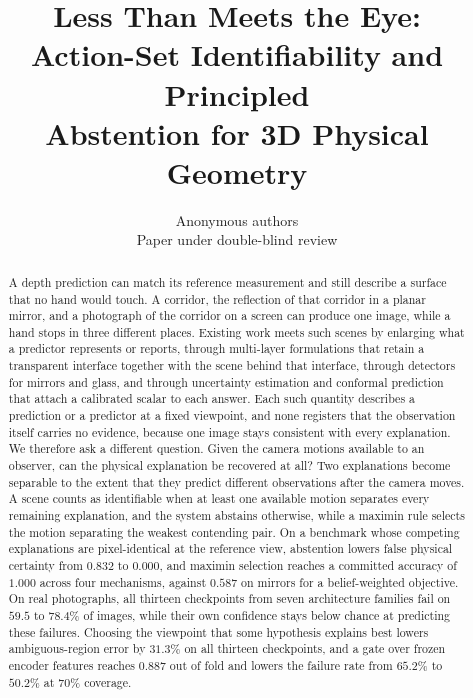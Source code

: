 \documentclass{article} %
\title{Less Than Meets the Eye: \\Action-Set Identifiability and Principled\\Abstention for 3D Physical Geometry}
\author{Anonymous authors \\ Paper under double-blind review}
\theoremstyle{defstyle}
\theoremstyle{plain}
\begin{document}
\maketitle
\suppressfloats[t]

\begin{abstract}
A depth prediction can match its reference measurement and still describe a surface that no
hand would touch. A corridor, the reflection of that corridor in a planar mirror, and a
photograph of the corridor on a screen can produce one image, while a hand stops in three
different places. Existing work meets such scenes by enlarging what a predictor
represents or reports, through multi-layer formulations that retain a transparent interface
together with the scene behind that interface, through detectors for mirrors and glass, and
through uncertainty estimation and conformal prediction that attach a calibrated scalar to
each answer. Each such quantity describes a prediction or a predictor at a fixed viewpoint,
and none registers that the observation itself carries no evidence, because one image stays
consistent with every explanation. We therefore ask a
different question. Given the camera motions available to an observer, can the physical
explanation be recovered at all? Two explanations become separable to the extent that
they predict different observations after the camera moves. A scene counts as identifiable
when at least one available motion separates every remaining explanation, and the system
abstains otherwise, while a maximin rule selects the motion separating the weakest
contending pair. On a benchmark whose competing explanations are pixel-identical at the
reference view, abstention lowers false physical certainty from $0.832$ to $0.000$, and
maximin selection reaches a committed accuracy of $1.000$ across four mechanisms, against
$0.587$ on mirrors for a belief-weighted objective. On real photographs, all thirteen
checkpoints from seven architecture families fail on $59.5$ to $78.4\%$ of images, while
their own confidence stays below chance at predicting these failures. Choosing the viewpoint
that some hypothesis explains best lowers ambiguous-region error by $31.3\%$ on all thirteen
checkpoints, and a gate over frozen encoder features reaches $0.887$ out of fold and lowers
the failure rate from $65.2\%$ to $50.2\%$ at $70\%$ coverage.
\end{abstract}

\end{document}
